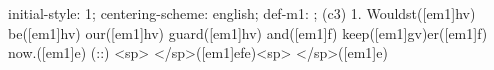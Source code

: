initial-style: 1;
centering-scheme: english;
def-m1: \grealign;
(c3) 1. Wouldst([em1]hv) be([em1]hv) our([em1]hv) guard([em1]hv) and([em1]f) keep([em1]gv)er([em1]f) now.([em1]e) (::) <sp> </sp>([em1]efe)<sp> </sp>([em1]e)